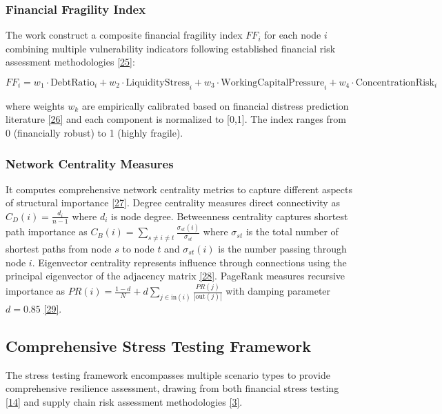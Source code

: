 \documentclass[a4 paper, 11pt,twoside]{article}
\newcommand{\0}{\Bf{0}}
\theoremstyle{definition}
\begin{document}
\subsubsection{Financial Fragility Index}

The work construct a composite financial fragility index $FF_i$ for each node $i$ combining multiple vulnerability indicators following established financial risk assessment methodologies \hyperref[ref25]{[25]}:

\begin{equation}
FF_i = w_1 \cdot \text{DebtRatio}_i + w_2 \cdot \text{LiquidityStress}_i + w_3 \cdot \text{WorkingCapitalPressure}_i + w_4 \cdot \text{ConcentrationRisk}_i
\end{equation}

where weights $w_k$ are empirically calibrated based on financial distress prediction literature \hyperref[ref26]{[26]} and each component is normalized to [0,1]. The index ranges from 0 (financially robust) to 1 (highly fragile).

\subsubsection{Network Centrality Measures}

It computes comprehensive network centrality metrics to capture different aspects of structural importance \hyperref[ref27]{[27]}. Degree centrality measures direct connectivity as $C_D(i) = \frac{d_i}{n-1}$ where $d_i$ is node degree. Betweenness centrality captures shortest path importance as $C_B(i) = \sum_{s \neq i \neq t} \frac{\sigma_{st}(i)}{\sigma_{st}}$ where $\sigma_{st}$ is the total number of shortest paths from node $s$ to node $t$ and $\sigma_{st}(i)$ is the number passing through node $i$. Eigenvector centrality represents influence through connections using the principal eigenvector of the adjacency matrix \hyperref[ref28]{[28]}. PageRank measures recursive importance as $PR(i) = \frac{1-d}{N} + d \sum_{j \in \text{in}(i)} \frac{PR(j)}{|\text{out}(j)|}$ with damping parameter $d=0.85$ \hyperref[ref29]{[29]}.

\subsection{Comprehensive Stress Testing Framework}

The stress testing framework encompasses multiple scenario types to provide comprehensive resilience assessment, drawing from both financial stress testing \hyperref[ref14]{[14]} and supply chain risk assessment methodologies \hyperref[ref3]{[3]}.
\end{document}

